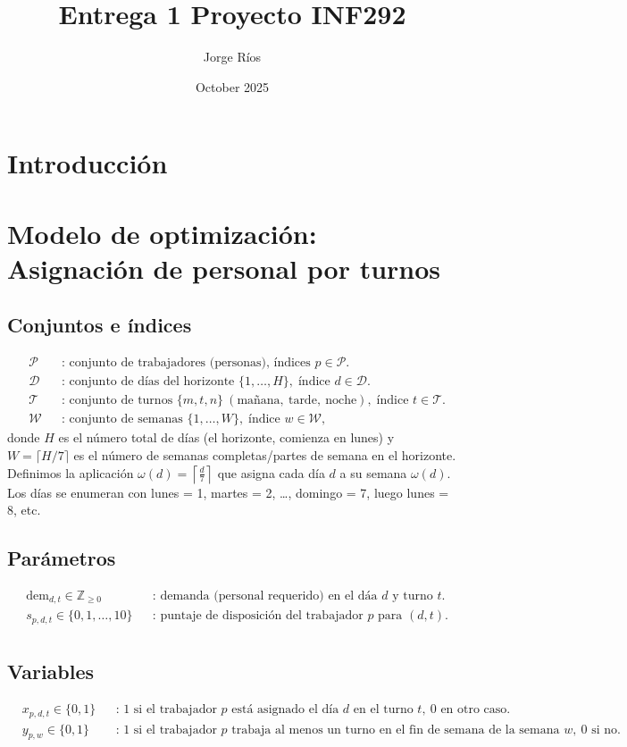 \documentclass{article}
\title{Entrega 1 Proyecto INF292}
\author{Jorge Ríos}
\date{October 2025}
\begin{document}
\section*{Introducción}

\section*{Modelo de optimización: Asignación de personal por turnos}

\subsection*{Conjuntos e índices}
\[
\begin{aligned}
&\mathcal{P} &&\text{: conjunto de trabajadores (personas), índices } p\in\mathcal{P}.\\
&\mathcal{D} &&\text{: conjunto de días del horizonte } \{1,\dots,H\},\; \text{índice } d\in\mathcal{D}.\\
&\mathcal{T} &&\text{: conjunto de turnos } \{m,t,n\} \ (\text{mañana},\ \text{tarde},\ \text{noche}),\; \text{índice } t\in\mathcal{T}.\\
&\mathcal{W} &&\text{: conjunto de semanas } \{1,\dots,W\},\; \text{índice } w\in\mathcal{W},
\end{aligned}
\]
donde \(H\) es el número total de d\'ias (el horizonte, comienza en lunes) y \(W=\lceil H/7\rceil\) es el número de semanas completas/partes de semana en el horizonte.  
Definimos la aplicación \(\omega(d)=\left\lceil \frac{d}{7}\right\rceil\) que asigna cada día \(d\) a su semana \(\omega(d)\). Los días se enumeran con lunes = 1, martes = 2, \dots, domingo = 7, luego lunes = 8, etc.

\subsection*{Parámetros}
\[
\begin{aligned}
&\text{dem}_{d,t} \in \mathbb{Z}_{\ge 0} &&\text{: demanda (personal requerido) en el dáa } d \text{ y turno } t.\\
&s_{p,d,t} \in \{0,1,\dots,10\} &&\text{: puntaje de disposición del trabajador } p \text{ para } (d,t).\\
\end{aligned}
\]

\subsection*{Variables}
\[
\begin{aligned}
&x_{p,d,t} \in \{0,1\} &&\text{: 1 si el trabajador } p \text{ está asignado el día } d \text{ en el turno } t,\ \text{0 en otro caso.}\\
&y_{p,w} \in \{0,1\} &&\text{: 1 si el trabajador } p \text{ trabaja al menos un turno en el fin de semana de la semana } w,\ \text{0 si no.}
\end{aligned}
\]
\end{document}
